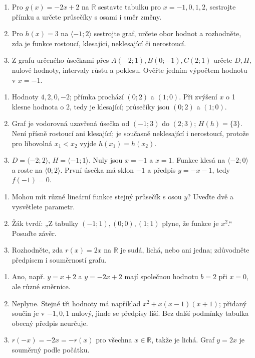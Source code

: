 \documentclass[11pt,a4paper]{article}
\begin{document}
\begin{zadaniReseniBox}
\begin{enumerate}[label=\alph*)]
\item Pro $g(x)=-2x+2$ na $\mathbb R$ sestavte tabulku pro $x=-1,0,1,2$, sestrojte přímku a určete průsečíky s osami i směr změny.
\item Pro $h(x)=3$ na $\langle-1;2\rangle$ sestrojte graf, určete obor hodnot a rozhodněte, zda je funkce rostoucí, klesající, neklesající či nerostoucí.
\item Z grafu určeného úsečkami přes $A(-2;1),B(0;-1),C(2;1)$ určete $D,H$, nulové hodnoty, intervaly růstu a poklesu. Ověřte jedním výpočtem hodnotu v $x=-1$.
\end{enumerate}
\tcblower
\begin{enumerate}[label=\alph*)]
\item Hodnoty $4,2,0,-2$; přímka prochází $(0;2)$ a $(1;0)$. Při zvýšení $x$ o 1 klesne hodnota o 2, tedy je klesající; průsečíky jsou $(0;2)$ a $(1;0)$.
\item Graf je vodorovná uzavřená úsečka od $(-1;3)$ do $(2;3)$; $H(h)=\{3\}$. Není přísně rostoucí ani klesající; je současně neklesající i nerostoucí, protože pro libovolná $x_1<x_2$ vyjde $h(x_1)=h(x_2)$.
\item $D=\langle-2;2\rangle$, $H=\langle-1;1\rangle$. Nuly jsou $x=-1$ a $x=1$. Funkce klesá na $\langle-2;0\rangle$ a roste na $\langle0;2\rangle$. První úsečka má sklon $-1$ a předpis $y=-x-1$, tedy $f(-1)=0$.
\end{enumerate}
\end{zadaniReseniBox}
\begin{zadaniReseniBox}
\begin{enumerate}[label=\alph*)]
\item Mohou mít různé lineární funkce stejný průsečík s osou $y$? Uveďte dvě a vysvětlete parametr.
\item Žák tvrdí: „Z tabulky $(-1;1),(0;0),(1;1)$ plyne, že funkce je $x^2$.“ Posuďte závěr.
\item Rozhodněte, zda $r(x)=2x$ na $\mathbb R$ je sudá, lichá, nebo ani jedna; zdůvodněte předpisem i souměrností grafu.
\end{enumerate}
\tcblower
\begin{enumerate}[label=\alph*)]
\item Ano, např. $y=x+2$ a $y=-2x+2$ mají společnou hodnotu $b=2$ při $x=0$, ale různé směrnice.
\item Neplyne. Stejné tři hodnoty má například $x^2+x(x-1)(x+1)$; přidaný součin je v $-1,0,1$ nulový, jinde se předpisy liší. Bez další podmínky tabulka obecný předpis neurčuje.
\item $r(-x)=-2x=-r(x)$ pro všechna $x\in\mathbb R$, takže je lichá. Graf $y=2x$ je souměrný podle počátku.
\end{enumerate}
\end{zadaniReseniBox}
\end{document}
